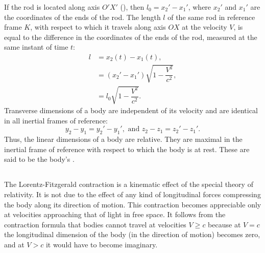 If the rod is located along axis $O'X'$ (), then $l_{0}= x_{2}'-x_{1}'$, where $x_{2}'$ and $x_{1}'$ are the coordinates of the ends of the rod. The length $l$ of the same rod in reference frame $K$, with respect to which it travels along axis $OX$ at the velocity $V$, is equal to the difference in the coordinates of the ends of the rod, measured at the same instant of time $t$:
\begin{align*}%
l & =x_{2}(t) - x_{1}(t), \\
& =(x_{2}'-x_{1}')\sqrt{1 - \dfrac{V^{2}}{c^{2}}}, \\
& =l_{0}\sqrt{1 - \dfrac{V^{2}}{c^{2}}}.
\end{align*}
Transverse dimensions of a body are independent of its velocity and are identical in all inertial frames of reference:
\begin{equation*}%
y_{2} - y_{1} = y_{2}' - y_{1}',\,\,\textrm{and}\,\,z_{2} - z_{1} = z_{2}' - z_{1}'.
\end{equation*}
Thus, the linear dimensions of a body are relative. They are maximal in the inertial frame of reference with respect to which the body is at rest. These are
said to be the body's .


\subsection{}\label{5.4.2} The Lorentz-Fitzgerald contraction is a kinematic effect of the special theory of relativ­ity. It is not due to the effect of any kind of longitudinal forces compressing the body along its direction of motion. This contraction becomes appreciable only at velocities approaching
that of light in free space. It follows from the contraction formula that bodies cannot travel at velocities $V \geqslant c$ because at $V = c$ the longitudinal dimen­sion of the body (in the direction of motion) becomes zero, and at $V > c$ it would have to become imaginary.

